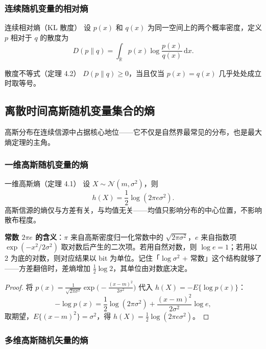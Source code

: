 \subsubsection{连续随机变量的相对熵}

\begin{definitionBox}{连续相对熵（KL 散度）}
设 $p(x)$ 和 $q(x)$ 为同一空间上的两个概率密度，定义 $p$ 相对于 $q$ 的散度为
\[
D(p\|q)=\int_{\mathbb{R}} p(x)\log\frac{p(x)}{q(x)}\,\mathrm{d}x.
\]
\end{definitionBox}

\begin{theoremBox}{散度不等式（定理 4.2）}
$D(p\|q)\ge 0$，当且仅当 $p(x)=q(x)$ 几乎处处成立时取等号。
\end{theoremBox}

\subsection{离散时间高斯随机变量集合的熵}

高斯分布在连续信源中占据核心地位——它不仅是自然界最常见的分布，也是最大熵定理的主角。

\subsubsection{一维高斯随机变量的熵}

\begin{theoremBox}{一维高斯熵（定理 4.1）}
设 $X\sim\mathcal{N}(m,\sigma^2)$，则
\[
h(X)=\frac{1}{2}\log(2\pi e\sigma^2).
\]
高斯信源的熵仅与方差有关，与均值无关——均值只影响分布的中心位置，不影响散布程度。

\noindent \textbf{常数 $2\pi e$ 的含义}：$\pi$ 来自高斯密度归一化常数中的 $\sqrt{2\pi\sigma^2}$，$e$ 来自指数项 $\exp(-x^2/2\sigma^2)$ 取对数后产生的二次项。若用自然对数，则 $\log e=1$；若用以 2 为底的对数，则对应结果以 bit 为单位。记住「$\log\sigma^2$ + 常数」这个结构就够了——方差翻倍时，差熵增加 $\frac12\log 2$，其单位由对数底决定。
\end{theoremBox}

\begin{proof}
将 $p(x)=\frac{1}{\sqrt{2\pi\sigma^2}}\exp\bigl(-\frac{(x-m)^2}{2\sigma^2}\bigr)$ 代入 $h(X)=-E\{\log p(x)\}$：
\[
-\log p(x)=\frac{1}{2}\log(2\pi\sigma^2)+\frac{(x-m)^2}{2\sigma^2}\log e,
\]
取期望，$E\{(x-m)^2\}=\sigma^2$，得 $h(X)=\frac{1}{2}\log(2\pi e\sigma^2)$。
\end{proof}

\subsubsection{多维高斯随机矢量的熵}

